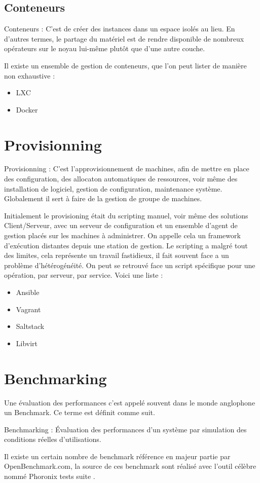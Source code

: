 \subsection{Conteneurs}

\begin{mydef}
Conteneurs : C'est de créer des instances dans un espace isolés au lieu. En d'autres termes, le partage du matériel est de rendre disponible de nombreux opérateurs sur le noyau lui-même plutôt que d'une autre couche. 
\end{mydef}

Il existe un ensemble de gestion de conteneurs, que l'on peut lister de manière non exhaustive : 
\begin{itemize}

\item LXC
\item Docker
\end{itemize}
\section{Provisionning}
 
\begin{mydef}
Provisionning : C'est l'approvisionnement de machines, afin de mettre en place des configuration, des allocaton automatiques de ressources, voir même des installation de logiciel, gestion de configuration, maintenance système. Globalement il sert à faire de  la gestion de groupe de machines. 
\end{mydef}
Initialement le provisioning était du scripting manuel, voir même des solutions Client/Serveur, avec un serveur de configuration et un ensemble d'agent de gestion placés sur les machines à administrer. On appelle cela un framework d’exécution distantes depuis une station de gestion.
Le scripting a malgré tout des limites, cela représente un travail fastidieux, il fait souvent face a un problème d'hétérogénéité. On peut se retrouvé face un script spécifique pour une opération, par serveur, par service.
Voici une liste :
\begin{itemize}

\item Ansible
\item Vagrant
\item Saltstack
\item Libvirt
\end{itemize}
\section{Benchmarking}
Une évaluation des performances c'est appelé souvent dans le monde anglophone un Benchmark. Ce terme est définit comme suit.
\begin{mydef}
Benchmarking : Évaluation des performances d'un système par simulation des conditions réelles d'utilisations. 
\end{mydef}
Il existe un certain nombre de benchmark référence en majeur partie par OpenBenchmark.com, la source de ces benchmark sont réalisé avec l’outil célèbre nommé Phoronix tests suite .

